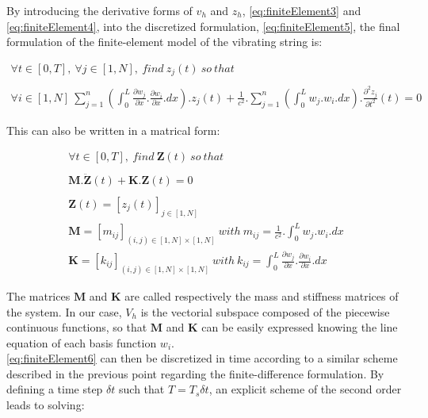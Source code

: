 {{By introducing the derivative forms of $v_h$ and $z_h$, \myequname \eqref{eq:finiteElement3} and \eqref{eq:finiteElement4}, into the discretized formulation, \myequname \eqref{eq:finiteElement5}, the final formulation of the finite-element model of the vibrating string is:

$$
\begin{array}{r}
	\forall t \in [0, T],\ \forall j \in [1, N],\ find\ z_j(t)\ so\ that \\
	\nonumber \\
	\forall i \in [1, N]\ \sum_{j=1}^{n} (\int_{0}^{L}\frac{\partial w_j}{\partial x} . \frac{\partial w_i}{\partial x} . dx) . z_j(t) + \frac{1}{c^2} . \sum_{j=1}^{n} (\int_{0}^{L} w_j . w_i . dx) . \frac{\partial^2 z_j}{\partial t^2}(t) = 0  
\end{array}
$$

This can also be written in a matrical form:

\begin{eqnarray}
	\forall t \in [0, T],\ find\ \boldsymbol{Z}(t)\ so\ that \nonumber \\
	\nonumber \\
	\boldsymbol{M} . \ddot{\boldsymbol{Z}}(t) + \boldsymbol{K} . \boldsymbol{Z}(t) = 0 \label{eq:finiteElement6} \\
	\nonumber \\
	\boldsymbol{Z}(t) = [z_j(t)]_{j \in [1, N]} \nonumber \\
	\boldsymbol{M} = [m_{ij}]_{(i, j) \in [1, N]\times[1, N]}\ with\ m_{ij} = \frac{1}{c^2} . \int_{0}^{L} w_j . w_i . dx \nonumber \\
	\boldsymbol{K} = [k_{ij}]_{(i, j) \in [1, N]\times[1, N]}\ with\ k_{ij} = \int_{0}^{L}\frac{\partial w_j}{\partial x} . \frac{\partial w_i}{\partial x} . dx \nonumber
\end{eqnarray}

The matrices $\boldsymbol{M}$ and $\boldsymbol{K}$ are called respectively the mass and stiffness matrices of the system. In our case, $V_h$ is the vectorial subspace composed of the piecewise continuous functions, so that $\boldsymbol{M}$ and $\boldsymbol{K}$ can be easily expressed knowing the line equation of each basis function $w_i$.\\

\myequname \eqref{eq:finiteElement6} can then be discretized in time according to a similar scheme described in the previous point regarding the finite-difference formulation. By defining a time step $\delta t$ such that $T = T_s\delta t$, an explicit scheme of the second order leads to solving:

}}
